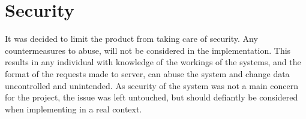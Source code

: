 \section{Security}


It was decided to limit the product from taking care of security. Any countermeasures to abuse, will not be considered in the implementation. This results in any individual with knowledge of the workings of the systems, and the format of the requests made to server, can abuse the system and change data uncontrolled and unintended. As security of the system was not a main concern for the project, the issue was left untouched, but should defiantly be considered when implementing in a real context.